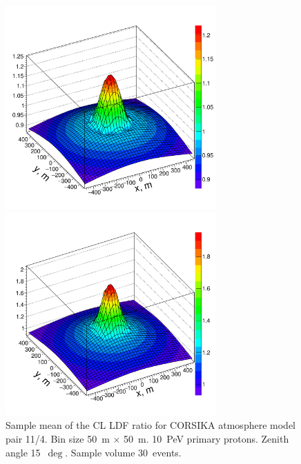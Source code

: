\documentclass[universe,article,submit,moreauthors,pdftex]{Definitions/mdpi}
\begin{document}
\begin{figure}[tb]
    \begin{minipage}[t]{0.48\textwidth}
        \centering
        \includegraphics[width=19pc]{10PeV_pro_15deg_m11_over_m04}%
        \vspace{-1.0pc}
        \caption{Sample mean of the CL LDF ratio for CORSIKA atmosphere model pair 11/4. Bin size 50~m $\times$ 50~m. 10~PeV primary protons. Zenith angle 15~$\deg$. Sample volume 30~events.}
        \label{fig:4d11}
    \end{minipage}
    \hfill
    \begin{minipage}[t]{0.48\textwidth}
        \centering
        \includegraphics[width=19pc]{10PeV_15deg_pro_over_Fe}%

\end{minipage}
\end{figure}
\end{document}
